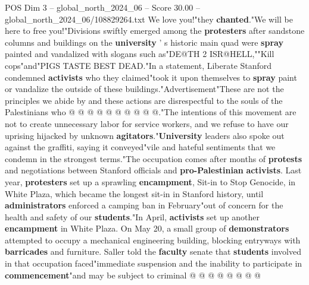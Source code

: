 \begin{textsample}{POS Dim 3 – global\_north\_2024\_06 – Score 30.00 – global\_north\_2024\_06/108829264.txt}
We love you!"they \textbf{chanted}."We will be here to free you!"Divisions swiftly emerged among the \textbf{protesters} after sandstone columns and buildings on the \textbf{university} ' s historic main quad were \textbf{spray} painted and vandalized with slogans such as"DE@TH 2 ISR@HELL,""Kill cops"and"PIGS TASTE BEST DEAD."In a statement, Liberate Stanford condemned \textbf{activists} who they claimed"took it upon themselves to \textbf{spray} paint or vandalize the outside of these buildings."Advertisement"These are not the principles we abide by and these actions are disrespectful to the souls of the Palestinians who @ @ @ @ @ @ @ @ @ @."The intentions of this movement are not to create unnecessary labor for service workers, and we refuse to have our uprising hijacked by unknown \textbf{agitators}."\textbf{University} leaders also spoke out against the graffiti, saying it conveyed"vile and hateful sentiments that we condemn in the strongest terms."The occupation comes after months of \textbf{protests} and negotiations between Stanford officials and \textbf{pro-Palestinian} \textbf{activists}.
Last year, \textbf{protesters} set up a sprawling \textbf{encampment}, Sit-in to Stop Genocide, in White Plaza, which became the longest sit-in in Stanford history, until \textbf{administrators} enforced a camping ban in February"out of concern for the health and safety of our \textbf{students}."In April, \textbf{activists} set up another \textbf{encampment} in White Plaza.
On May 20, a small group of \textbf{demonstrators} attempted to occupy a mechanical engineering building, blocking entryways with \textbf{barricades} and furniture.
Saller told the \textbf{faculty} senate that \textbf{students} involved in that occupation faced"immediate suspension and the inability to participate in \textbf{commencement}"and may be subject to criminal @ @ @ @ @ @ @ @

\end{textsample}
